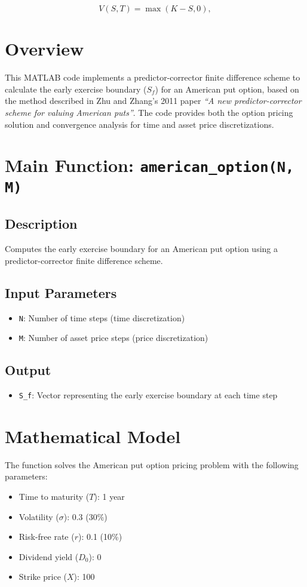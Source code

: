 \documentclass[12pt]{article}
\begin{document}
\begin{equation}
V(S, T) = \max(K - S, 0),
\end{equation}

\section*{Overview}
This MATLAB code implements a predictor-corrector finite difference scheme to calculate the early exercise boundary ($S_f$) for an American put option, based on the method described in Zhu and Zhang's 2011 paper \textit{``A new predictor-corrector scheme for valuing American puts''}. The code provides both the option pricing solution and convergence analysis for time and asset price discretizations.

\section*{Main Function: \texttt{american\_option(N, M)}}

\subsection*{Description}
Computes the early exercise boundary for an American put option using a predictor-corrector finite difference scheme.

\subsection*{Input Parameters}
\begin{itemize}
  \item \texttt{N}: Number of time steps (time discretization)
  \item \texttt{M}: Number of asset price steps (price discretization)
\end{itemize}

\subsection*{Output}
\begin{itemize}
  \item \texttt{S\_f}: Vector representing the early exercise boundary at each time step
\end{itemize}

\section*{Mathematical Model}
The function solves the American put option pricing problem with the following parameters:
\begin{itemize}
  \item Time to maturity ($T$): 1 year
  \item Volatility ($\sigma$): 0.3 (30\%)
  \item Risk-free rate ($r$): 0.1 (10\%)
  \item Dividend yield ($D_0$): 0
  \item Strike price ($X$): 100
\end{itemize}
\end{document}

